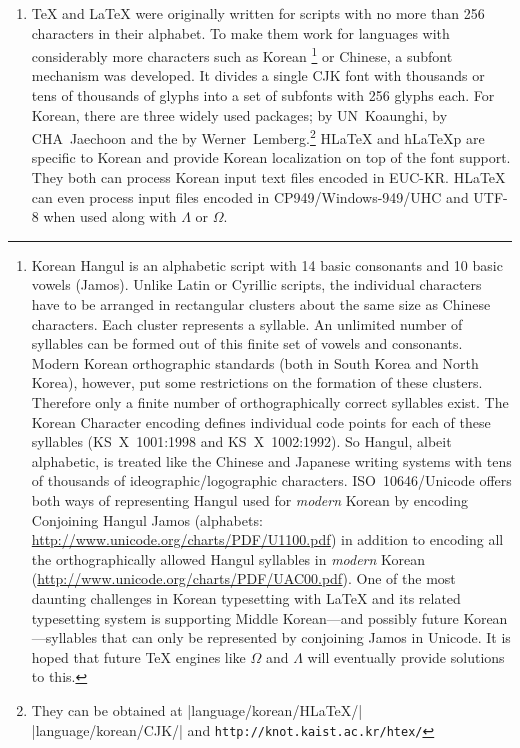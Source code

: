 \begin{enumerate}
\item \TeX{} and \LaTeX{} were originally written for
scripts with no more than 256 characters in their alphabet.
To make them work for languages with considerably 
more characters such as
Korean%
 \footnote{Korean Hangul is an alphabetic script with 14 basic consonants
 and 10 basic vowels (Jamos). Unlike Latin or Cyrillic scripts, the
 individual characters have to be arranged in rectangular
 clusters about the same size as Chinese characters. Each cluster
 represents a syllable. An unlimited number of syllables can be
 formed out of this finite set of vowels and consonants. Modern Korean
 orthographic standards (both in South Korea and  North Korea), however,
 put some restrictions on the formation of these clusters.
 Therefore only a finite number of  orthographically correct syllables exist.
 The Korean Character encoding defines individual code points for each of these syllables (KS~X~1001:1998 and KS~X~1002:1992). So Hangul, albeit alphabetic, is
 treated like the Chinese and Japanese writing systems with tens of thousands of
 ideographic/logographic characters.  ISO~10646/Unicode offers both ways of
 representing Hangul used for \emph{modern} Korean by encoding Conjoining
 Hangul Jamos (alphabets: \url{http://www.unicode.org/charts/PDF/U1100.pdf})
 in addition to encoding all the orthographically allowed Hangul syllables in
 \emph{modern} Korean (\url{http://www.unicode.org/charts/PDF/UAC00.pdf}).
 One of the most daunting challenges in Korean typesetting with
 \LaTeX{} and its related typesetting system is supporting Middle Korean---and possibly future Korean---syllables that can only be represented
 by conjoining Jamos in Unicode. It is hoped that future \TeX{} engines like $\Omega$ and
 $\Lambda$ will eventually provide solutions to this.}
or Chinese, a subfont mechanism was developed.
It divides a single CJK font with  thousands or tens of thousands of
glyphs into a set of subfonts with 256 glyphs each. 
For Korean, there are three widely used packages;  
by UN~Koaunghi,  by CHA~Jaechoon and the 
by Werner~Lemberg.\footnote{%
They can be obtained at \CTANref|language/korean/HLaTeX/|\\
   \CTANref|language/korean/CJK/| and
   \texttt{http://knot.kaist.ac.kr/htex/}}
H\LaTeX{} and h\LaTeX{}p are specific to Korean and provide
Korean localization on top of the font support.
They both can process Korean input text files encoded in EUC-KR. H\LaTeX{} can
even process input files encoded in CP949/Windows-949/UHC and UTF-8
when used along with $\Lambda$ or $\Omega$.


\end{enumerate}
